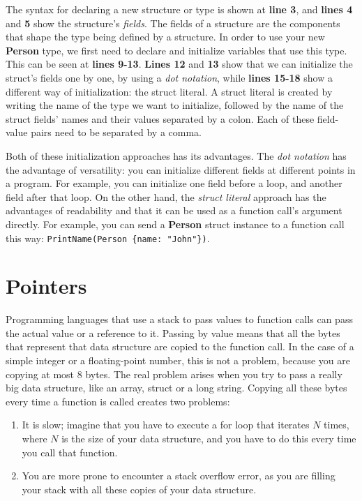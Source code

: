 \documentclass[11pt,fleqn,openany]{book} %
\begin{document}
The syntax for declaring a new structure or type is shown at \textbf{line 3}, and \textbf{lines 4} and \textbf{5} show the structure's \emph{fields}. The fields of a structure are the components that shape the type being defined by a structure. In order to use your new \textbf{Person} type, we first need to declare and initialize variables that use this type. This can be seen at \textbf{lines 9-13}. \textbf{Lines 12} and \textbf{13} show that we can initialize the struct's fields one by one, by using a \emph{dot notation}, while \textbf{lines 15-18} show a different way of initialization: the struct literal. A struct literal is created by writing the name of the type we want to initialize, followed by the name of the struct fields' names and their values separated by a colon. Each of these field-value pairs need to be separated by a comma.

Both of these initialization approaches has its advantages. The \emph{dot notation} has the advantage of versatility: you can initialize different fields at different points in a program. For example, you can initialize one field before a loop, and another field after that loop. On the other hand, the \emph{struct literal} approach has the advantages of readability and that it can be used as a function call's argument directly. For example, you can send a \textbf{Person} struct instance to a function call this way: \lstinline|PrintName(Person {name: "John"})|.

\section{Pointers}
\label{section:pointers}

Programming languages that use a stack to pass values to function calls can pass the actual value or a reference to it. Passing by value means that all the bytes that represent that data structure are copied to the function call. In the case of a simple integer or a floating-point number, this is not a problem, because you are copying at most 8 bytes. The real problem arises when you try to pass a really big data structure, like an array, struct or a long string. Copying all these bytes every time a function is called creates two problems:
\begin{enumerate}
    \item It is slow; imagine that you have to execute a for loop that iterates $N$ times, where $N$ is the size of your data structure, and you have to do this every time you call that function.
    \item You are more prone to encounter a stack overflow error, as you are filling your stack with all these copies of your data structure.
\end{enumerate}
\end{document}
